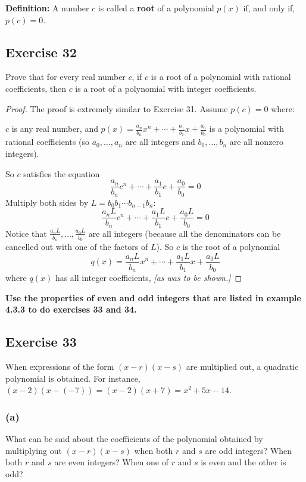 \documentclass[14pt]{extarticle}
\newcommand{\dps}{\displaystyle}
\newcommand{\cy}{\color{cyan}}
\begin{document}
\begin{tcolorbox}[colframe=cyan]
{\bf \cy Definition:} A number $c$ is called a {\bf root} of a polynomial $p(x)$ if, and only if, $p(c) = 0$.
\end{tcolorbox}

\subsection{Exercise 32}
Prove that for every real number $c$, if $c$ is a root of a polynomial with rational coefficients, then $c$ is a root of a polynomial with integer coefficients.

\begin{proof}
The proof is extremely similar to Exercise 31. Assume $p(c) = 0$ where: 

$c$ is any real number, and $p(x) = \dps\frac{a_n}{b_n}x^n + \cdots + \frac{a_1}{b_1}x + \frac{a_0}{b_0}$ is a polynomial with rational coefficients (so $a_0, \ldots, a_n$ are all integers and $b_0, \ldots, b_n$ are all nonzero integers).

So $c$ satisfies the equation
\[
\frac{a_n}{b_n}c^n + \cdots + \frac{a_1}{b_1}c + \frac{a_0}{b_0} = 0
\]
Multiply both sides by $L = b_0b_1\cdots b_{n-1}b_n$:
\[
\frac{a_n L}{b_n}c^n + \cdots + \frac{a_1 L}{b_1}c + \frac{a_0 L}{b_0} = 0
\]
Notice that $\dps\frac{a_nL}{b_n}, \ldots, \frac{a_0L}{b_0}$ are all integers (because all the denominators can be cancelled out with one of the factors of $L$). So $c$ is the root of a polynomial
\[
q(x) = \frac{a_n L}{b_n}x^n + \cdots + \frac{a_1 L}{b_1}x + \frac{a_0 L}{b_0}
\]
where $q(x)$ has all integer coefficients, {\it [as was to be shown.]}
\end{proof}

{\bf \cy Use the properties of even and odd integers that are listed in example 4.3.3 to do exercises 33 and 34.}

\subsection{Exercise 33}
When expressions of the form $(x - r)(x - s)$ are multiplied out, a quadratic polynomial is obtained. For instance, $(x - 2)(x - (-7)) = (x - 2)(x + 7) = x^2 + 5x - 14$.

\subsubsection{(a)}
What can be said about the coefficients of the polynomial obtained by multiplying out $(x - r)(x - s)$ when both $r$ and $s$ are odd integers? When both $r$ and $s$ are even integers? When one of $r$ and $s$ is even and the other is odd?
\end{document}
